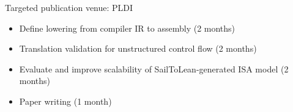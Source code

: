 \documentclass[a4paper]{scrartcl}
\begin{document}
Targeted publication venue: PLDI

\begin{itemize}
\item
  Define lowering from compiler IR to assembly (2 months)
\item
  Translation validation for unstructured control flow (2 months)
\item
  Evaluate and improve scalability of SailToLean-generated ISA model (2
  months)
\item
  Paper writing (1 month)
\end{itemize}









\end{document}
